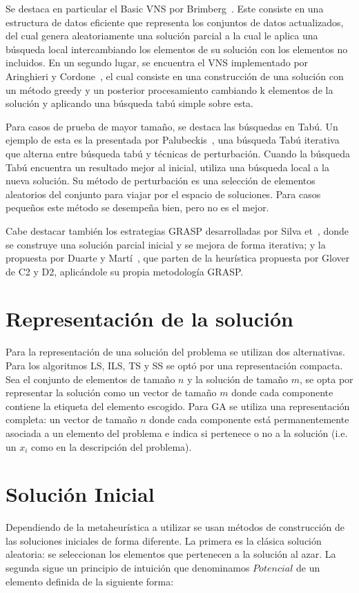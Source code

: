 \documentclass{ci5652}
\begin{document}
Se destaca en particular el Basic VNS por Brimberg~\cite{vnsbrimberg}. Este consiste en una estructura de datos eficiente que representa los conjuntos de datos actualizados, del cual genera aleatoriamente una solución parcial a la cual le aplica una búsqueda local intercambiando los elementos de su solución con los elementos no incluidos.
En un segundo lugar, se encuentra el VNS implementado por Aringhieri y Cordone~\cite{vnsarincor}, el cual consiste en una construcción de una solución con un método greedy y un posterior procesamiento cambiando k elementos de la solución y aplicando una búsqueda tabú simple sobre esta.

Para casos de prueba de mayor tamaño, se destaca las búsquedas en Tabú. Un ejemplo de esta es la presentada por Palubeckis~\cite{palubeckis}, una búsqueda Tabú iterativa que alterna entre búsqueda tabú y técnicas de perturbación. Cuando la búsqueda Tabú encuentra un resultado mejor al inicial, utiliza una búsqueda local a la nueva solución. Su método de perturbación es una selección de elementos aleatorios del conjunto para viajar por el espacio de soluciones. Para casos pequeños este método se desempeña bien, pero no es el mejor.

Cabe destacar también los estrategias GRASP desarrolladas por Silva et~\cite{silva}, donde se construye una solución parcial inicial y se mejora de forma iterativa; y la propuesta por Duarte y Martí~\cite{duarmar}, que parten de la heurística propuesta por Glover de C2 y D2, aplicándole su propia metodología GRASP.

\section{Representación de la solución}
Para la representación de una solución del problema se utilizan dos alternativas. Para los algoritmos LS, ILS, TS y SS se optó por una representación compacta.
Sea el conjunto de elementos de tamaño $n$ y la solución de tamaño $m$, se opta por representar la solución como un vector de tamaño $m$ donde cada componente contiene la etiqueta del elemento escogido. Para GA se utiliza una representación completa: un vector de tamaño $n$ donde cada componente está permanentemente asociada a un elemento del problema e indica si pertenece o no a la solución (i.e. un $x_i$ como en la descripción del problema).

\section{Solución Inicial}
Dependiendo de la metaheurística a utilizar se usan métodos de construcción de las soluciones iniciales de forma diferente. La primera es la clásica solución aleatoria: se seleccionan los elementos que pertenecen a la solución al azar. La segunda sigue un principio de intuición que denominamos $Potencial$ de un elemento definida de la siguiente forma:
\end{document}
